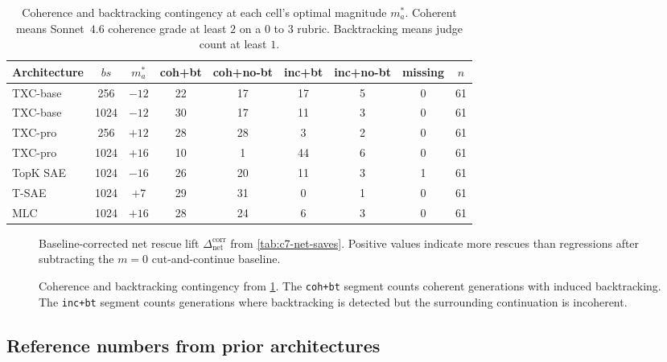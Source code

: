 \begin{table}[t]
    \centering
    \small
    \setlength{\tabcolsep}{4pt}
    \begin{tabular}{l c c c c c c c c}
        \toprule
        Architecture & $bs$ & $m^*_a$ & coh+bt & coh+no-bt & inc+bt & inc+no-bt & missing & $n$ \\
        \midrule
        TXC-base & 256 & $-12$ & 22 & 17 & 17 & 5 & 0 & 61 \\
        TXC-base & 1024 & $-12$ & 30 & 17 & 11 & 3 & 0 & 61 \\
        TXC-pro & 256 & $+12$ & 28 & 28 & 3 & 2 & 0 & 61 \\
        TXC-pro & 1024 & $+16$ & 10 & 1 & 44 & 6 & 0 & 61 \\
        TopK SAE & 1024 & $-16$ & 26 & 20 & 11 & 3 & 1 & 61 \\
        T-SAE & 1024 & $+7$ & 29 & 31 & 0 & 1 & 0 & 61 \\
        MLC & 1024 & $+16$ & 28 & 24 & 6 & 3 & 0 & 61 \\
        \bottomrule
    \end{tabular}
    \vspace{3em}
    \caption{Coherence and backtracking contingency at each cell's optimal magnitude $m^*_a$. Coherent means Sonnet~$4.6$ coherence grade at least $2$ on a $0$ to $3$ rubric. Backtracking means judge count at least $1$.}
    \label{tab:c7-contingency}
\end{table}

\begin{figure}[t]
    \centering
    \caption{Baseline-corrected net rescue lift $\Delta_{\text{net}}^{\text{corr}}$ from \cref{tab:c7-net-saves}. Positive values indicate more rescues than regressions after subtracting the $m=0$ cut-and-continue baseline.}
    \label{fig:c7-net-saves}
\end{figure}

\begin{figure}[t]
    \centering
    \caption{Coherence and backtracking contingency from \cref{tab:c7-contingency}. The \texttt{coh+bt} segment counts coherent generations with induced backtracking. The \texttt{inc+bt} segment counts generations where backtracking is detected but the surrounding continuation is incoherent.}
    \label{fig:c7-contingency}
\end{figure}



\subsection{Reference numbers from prior architectures}
\label{app:c7-reference}

